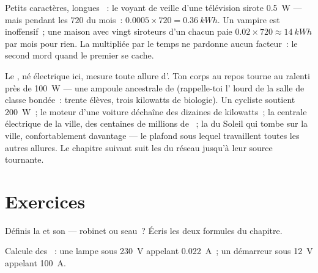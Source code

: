 \begin{example}\label{ex:g9:electric-power-energy:standby}
Petits caractères, longues ~: le voyant de veille d'une
télévision sirote \qty{0.5}{W} --- mais pendant les $720$  du
mois~: $0.0005 \times 720 = \qty{0.36}{kWh}$. Un vampire est
inoffensif~; une maison avec vingt siroteurs d'un  chacun paie
$0.02 \times 720 \approx \qty{14}{kWh}$ par mois pour rien. La
 multipliée par le temps ne pardonne aucun facteur~: le
second mord quand le premier se cache.
\end{example}

\begin{remark}\label{rem:g9:electric-power-energy:wider}
Le , né électrique ici, mesure toute allure d'. Ton corps au
repos tourne au ralenti près de \qty{100}{W} --- une ampoule ancestrale
de  (rappelle-toi l' lourd de la salle de classe bondée~:
trente élèves, trois kilowatts de biologie). Un cycliste soutient
\qty{200}{W}~; le moteur d'une voiture déchaîne des dizaines de
kilowatts~; la centrale électrique de la ville, des centaines de
millions de ~; la  du Soleil qui tombe sur la ville,
confortablement davantage --- le plafond sous lequel travaillent
toutes les autres allures. Le chapitre suivant suit les  du
réseau jusqu'à leur source tournante.
\end{remark}

\section{Exercices}

\begin{exercise}[$\star$]\label{exo:g9:electric-power-energy:1}
Définis la  et son  --- robinet ou seau~? Écris les deux
formules du chapitre.
\end{exercise}

\begin{exercise}[$\star$]\label{exo:g9:electric-power-energy:2}
Calcule des ~: une lampe sous \qty{230}{V} appelant
\qty{0.022}{A}~; un démarreur sous \qty{12}{V} appelant \qty{100}{A}.
\end{exercise}

